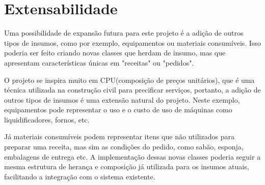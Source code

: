 \section{Extensabilidade}
Uma possibilidade de expansão futura para este projeto é a adição de outros tipos de insumos, como por exemplo, equipamentos ou materiais consumíveis.
Isso poderia ser feito criando novas classes que herdam de insumo, mas que apresentam características únicas em "receitas" ou "pedidos".

O projeto se inspira muito em CPU(composição de preços unitários), que é uma técnica utilizada na construção civil para precificar serviços, portanto, a adição de outros tipos de insumos é uma extensão natural do projeto.
Neste exemplo, equipamentos pode representar o uso e o custo de uso de máquinas como liquidificadores, fornos, etc.

Já materiais consumíveis podem representar itens que não utilizados para preparar uma receita, mas sim as condições do pedido, como sabão, esponja, embalagens de entrega etc.
A implementação dessas novas classes poderia seguir a mesma estrutura de herança e composição já utilizada para os insumos atuais, facilitando a integração com o sistema existente.
